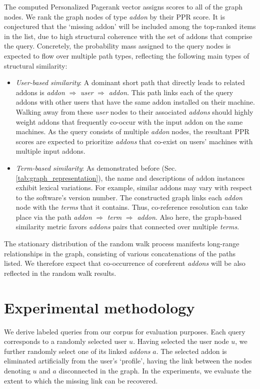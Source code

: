 \documentclass[11pt,oneside]{book}
\let\Oldsection\section
\renewcommand{\section}{\FloatBarrier\Oldsection}
\begin{document}
The computed Personalized Pagerank vector assigns scores to all of the
graph nodes. We rank the graph nodes of type {\it addon} by their PPR score. It is conjectured that the `missing addon' will be included among the top-ranked items in the list, due to high structural coherence with the set of addons that comprise the query. Concretely, the probability mass assigned to the query nodes is expected to flow over multiple path types, reflecting the following main types of structural similarity:
\begin{itemize}
\item {\it User-based similarity}: A dominant short path that
  directly leads to related addons is {\it addon} $\Rightarrow$ {\it user}
   $\Rightarrow$ {\it addon}. This path links each of the query addons
  with other users that have the same addon installed on their
  machine. Walking away from these {\it user} nodes to their associated
  {\it addons} should highly weight addons that frequently
  co-occur with the input addon on the same machines. As the query consists of multiple {\it addon} nodes, the resultant PPR scores are expected to prioritize {\it addons} that co-exist on users' machines with multiple input addons.   
\item {\it Term-based similarity}: As demonstrated before
  (Sec. \autoref{tab:graph_representation}), the name and descriptions of addon
  instances exhibit lexical variations. For example, similar addons may vary with respect to the software's version number. The constructed graph links each {\it addon} node with the {\it terms} that it contains. Thus, co-reference resolution can take place via the path {\it addon}
  $\Rightarrow$ {\it term} $\Rightarrow$ {\it addon}. Also here, the graph-based similarity metric favors {\it addons} pairs that connected over multiple {\it terms}. 
\end{itemize}

The stationary distribution of the random walk process manifests long-range relationships in the graph, consisting of various concatenations of the paths listed. We therefore expect that co-occurrence of coreferent {\it addons} will be also reflected in the random walk results.


\section{Experimental methodology}

We derive labeled queries from our corpus for evaluation purposes.  Each query corresponds to a randomly selected user $u$. Having selected the user node $u$, we further randomly select one of its linked {\it addons} $a$. The selected addon is eliminated artificially from the user's `profile', having the link between the nodes denoting $u$ and $a$ disconnected in the graph. In
the experiments, we evaluate the extent to which the missing link can
be recovered. 
\end{document}
